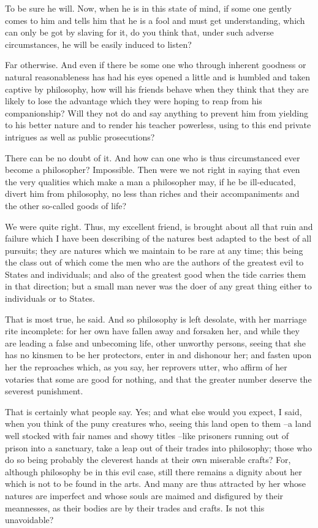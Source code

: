 To be sure he will.
Now, when he is in this state of mind, if some one gently comes to him and tells him that he is a fool and must get understanding, which can only be got by slaving for it, do you think that, under such adverse circumstances, he will be easily induced to listen?

Far otherwise.
And even if there be some one who through inherent goodness or natural reasonableness has had his eyes opened a little and is humbled and taken captive by philosophy, how will his friends behave when they think that they are likely to lose the advantage which they were hoping to reap from his companionship? Will they not do and say anything to prevent him from yielding to his better nature and to render his teacher powerless, using to this end private intrigues as well as public prosecutions?

There can be no doubt of it.
And how can one who is thus circumstanced ever become a philosopher?
Impossible.
Then were we not right in saying that even the very qualities which make a man a philosopher may, if he be ill-educated, divert him from philosophy, no less than riches and their accompaniments and the other so-called goods of life?

We were quite right.
Thus, my excellent friend, is brought about all that ruin and failure which I have been describing of the natures best adapted to the best of all pursuits; they are natures which we maintain to be rare at any time; this being the class out of which come the men who are the authors of the greatest evil to States and individuals; and also of the greatest good when the tide carries them in that direction; but a small man never was the doer of any great thing either to individuals or to States.

That is most true, he said.
And so philosophy is left desolate, with her marriage rite incomplete: for her own have fallen away and forsaken her, and while they are leading a false and unbecoming life, other unworthy persons, seeing that she has no kinsmen to be her protectors, enter in and dishonour her; and fasten upon her the reproaches which, as you say, her reprovers utter, who affirm of her votaries that some are good for nothing, and that the greater number deserve the severest punishment.

That is certainly what people say.
Yes; and what else would you expect, I said, when you think of the puny creatures who, seeing this land open to them --a land well stocked with fair names and showy titles --like prisoners running out of prison into a sanctuary, take a leap out of their trades into philosophy; those who do so being probably the cleverest hands at their own miserable crafts? For, although philosophy be in this evil case, still there remains a dignity about her which is not to be found in the arts. And many are thus attracted by her whose natures are imperfect and whose souls are maimed and disfigured by their meannesses, as their bodies are by their trades and crafts. Is not this unavoidable?

